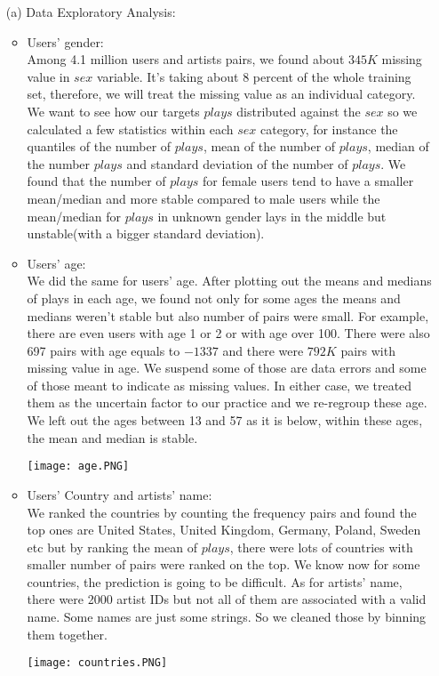 \documentclass[12pt]{article}
\newcommand\tab[1][0.5cm]{\hspace*{#1}}
\begin{document}
\begin{enumerate}
\item[(a)]
Data Exploratory Analysis: 
    \begin{itemize}
        \item Users' gender: \\
            \tab Among 4.1 million users and artists pairs, we found about $345K$ missing value in $sex$ variable. It's taking about 8 percent of the whole training set, therefore, we will treat the missing value as an individual category. We want to see how our targets $plays$ distributed against the $sex$ so we calculated a few statistics within each $sex$ category, for instance the quantiles of the number of $plays$, mean of the number of $plays$, median of the number $plays$ and standard deviation of the number of $plays$. We found that the number of $plays$ for female users tend to have a smaller mean/median and more stable compared to male users while the mean/median for $plays$ in unknown gender lays in the middle but unstable(with a bigger standard deviation). 
        \item Users' age:\\
            \tab We did the same for users' age. After plotting out the means and medians of plays in each age, we found not only for some ages the means and medians weren't stable but also number of pairs were small. For example, there are even users with age 1 or 2 or with age over 100. There were also 697 pairs with age equals to $-1337$ and there were $792K$ pairs with missing value in age. We suspend some of those are data errors and some of those meant to indicate as missing values. In either case, we treated them as the uncertain factor to our practice and we re-regroup these age. We left out the ages between 13 and 57 as it is below, within these ages, the mean and median is stable. \\
            \begin{center} \texttt{[image: age.PNG]} \end{center}
            \newpage
        \item Users' Country and artists' name: \\
            \tab We ranked the countries by counting the frequency pairs and found the top ones are United States, United Kingdom, Germany, Poland, Sweden etc but by ranking the mean of $plays$, there were lots of countries with smaller number of pairs were ranked on the top. We know now for some countries, the prediction is going to be difficult. As for artists' name, there were 2000 artist IDs but not all of them are associated with a valid name. Some names are just some strings. So we cleaned those by binning them together. 
            \begin{center} \texttt{[image: countries.PNG]} \end{center}
   \end{itemize}


\end{enumerate}
\end{document}
